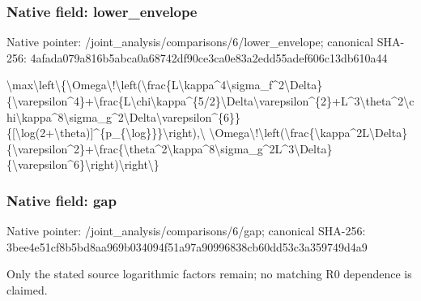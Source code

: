 \documentclass[10pt,a4paper]{article}
\begin{document}
\subsubsection{Native field: lower\_envelope}


Native pointer: /joint\_analysis/comparis\allowbreak{}ons/6/lower\_envelope; canonical SHA-256: 4afada079a816b5abca0a687\allowbreak{}42df90ce3ca0e83a2edd55ad\allowbreak{}ef606c13db610a44


\textbackslash{}max\textbackslash{}left\textbackslash{}\{\textbackslash{}Omega\textbackslash{}!\textbackslash{}left\allowbreak{}(\textbackslash{}frac\{L\textbackslash{}kappa\textasciicircum{}4\textbackslash{}sigma\_f\allowbreak{}\textasciicircum{}2\textbackslash{}Delta\}\{\textbackslash{}varepsilon\textasciicircum{}4\}\allowbreak{}+\textbackslash{}frac\{L\textbackslash{}chi\textbackslash{}kappa\textasciicircum{}\{5/2\}\allowbreak{}\textbackslash{}Delta\textbackslash{}varepsilon\textasciicircum{}\{2\}+L\allowbreak{}\textasciicircum{}3\textbackslash{}theta\textasciicircum{}2\textbackslash{}chi\textbackslash{}kappa\textasciicircum{}8\textbackslash{}s\allowbreak{}igma\_g\textasciicircum{}2\textbackslash{}Delta\textbackslash{}varepsilo\allowbreak{}n\textasciicircum{}\{6\}\}\{[\textbackslash{}log(2+\textbackslash{}theta)]\allowbreak{}\textasciicircum{}\{p\_\{\textbackslash{}log\}\}\}\textbackslash{}right),\textbackslash{} \textbackslash{}Omega\textbackslash{}!\textbackslash{}left(\textbackslash{}frac\{\textbackslash{}kap\allowbreak{}pa\textasciicircum{}2L\textbackslash{}Delta\}\{\textbackslash{}varepsilon\allowbreak{}\textasciicircum{}2\}+\textbackslash{}frac\{\textbackslash{}theta\textasciicircum{}2\textbackslash{}kappa\allowbreak{}\textasciicircum{}8\textbackslash{}sigma\_g\textasciicircum{}2L\textasciicircum{}3\textbackslash{}Delta\}\{\textbackslash{}\allowbreak{}varepsilon\textasciicircum{}6\}\textbackslash{}right)\textbackslash{}rig\allowbreak{}ht\textbackslash{}\}


\subsubsection{Native field: gap}


Native pointer: /joint\_analysis/comparisons/6/gap; canonical SHA-256: 3bee4e51cf8b5bd8aa969b03\allowbreak{}4094f51a97a90996838cb60d\allowbreak{}d53c3a359749d4a9


Only the stated source logarithmic factors remain; no matching R0 dependence is claimed.
\end{document}
